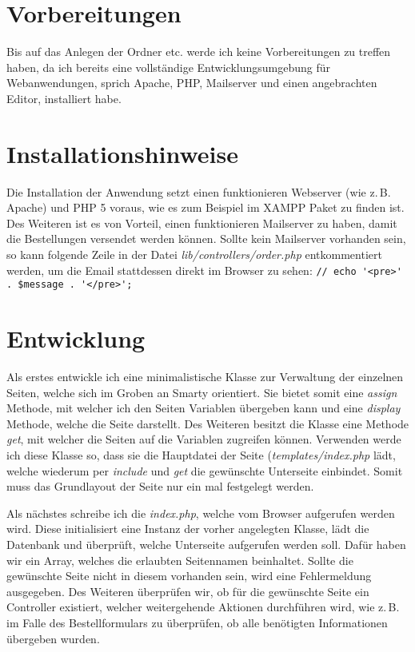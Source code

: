 \section{Vorbereitungen}
Bis auf das Anlegen der Ordner etc. werde ich keine Vorbereitungen zu
treffen haben, da ich bereits eine vollständige Entwicklungsumgebung
für Webanwendungen, sprich Apache, PHP, Mailserver und einen
angebrachten Editor, installiert habe.

\section{Installationshinweise}
Die Installation der Anwendung setzt einen funktionieren Webserver
(wie z.\,B. Apache) und PHP 5 voraus, wie es zum Beispiel im XAMPP
Paket zu finden ist. Des Weiteren ist es von Vorteil, einen
funktionieren Mailserver zu haben, damit die Bestellungen versendet
werden können. Sollte kein Mailserver vorhanden sein, so kann folgende
Zeile in der Datei {\em lib/controllers/order.php} entkommentiert
werden, um die Email stattdessen direkt im Browser zu sehen:
\lstinline|// echo '<pre>' . $message . '</pre>';|


\section{Entwicklung}
Als erstes entwickle ich eine minimalistische Klasse zur Verwaltung
der einzelnen Seiten, welche sich im Groben an Smarty orientiert. Sie
bietet somit eine {\em assign} Methode, mit welcher ich den Seiten
Variablen übergeben kann und eine {\em display} Methode, welche die
Seite darstellt. Des Weiteren besitzt die Klasse eine Methode {\em
  get}, mit welcher die Seiten auf die Variablen zugreifen können.
Verwenden werde ich diese Klasse so, dass sie die Hauptdatei der Seite
({\em templates/index.php} lädt, welche wiederum per {\em include} und
{\em get} die gewünschte Unterseite einbindet. Somit muss das
Grundlayout der Seite nur ein mal festgelegt werden.

Als nächstes schreibe ich die {\em index.php}, welche vom Browser
aufgerufen werden wird. Diese initialisiert eine Instanz der vorher
angelegten Klasse, lädt die Datenbank und überprüft, welche Unterseite
aufgerufen werden soll. Dafür haben wir ein Array, welches die
erlaubten Seitennamen beinhaltet. Sollte die gewünschte Seite nicht in
diesem vorhanden sein, wird eine Fehlermeldung ausgegeben. Des
Weiteren überprüfen wir, ob für die gewünschte Seite ein Controller
existiert, welcher weitergehende Aktionen durchführen wird, wie z.\,B.
im Falle des Bestellformulars zu überprüfen, ob alle benötigten
Informationen übergeben wurden.


